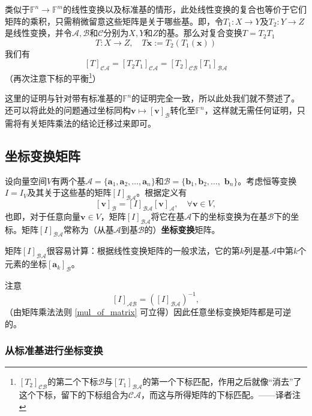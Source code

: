 类似于$\mathbb{F}^n\to \mathbb{F}^m$的线性变换以及标准基的情形，此处线性变换的复合也等价于它们矩阵的乘积，只需稍微留意这些矩阵是关于哪些基。即，令$T_{1}:X\to Y$及$T_{2}:Y\to Z$是线性变换，并令$\mathcal{A},\mathcal{B}$和$\mathcal{C}$分别为$X,Y$和$Z$的基。那么对复合变换$T=T_2T_1$
\[T:X\to Z,\quad T\mathbf{x}:=T_2(T_1(\mathbf{x}))\]
我们有
\begin{equation}\label{mul_of_matrix}
  \left[T\right]_{\mathcal{CA}}=\left[T_2T_1\right]_{\mathcal{CA}}=\left[T_2\right]_{\mathcal{CB}}\left[T_1\right]_{\mathcal{BA}}
\end{equation}
（再次注意下标的平衡\footnote{$\left[T_2\right]_{\mathcal{CB}}$的第二个下标$\mathcal{B}$与$\left[T_1\right]_{\mathcal{BA}}$的第一个下标匹配，作用之后就像“消去”了这个下标，留下的下标组合为$\mathcal{CA}$，而这与所得矩阵的下标匹配。——译者注}）

这里的证明与针对带有标准基的$\mathbb{F}^n$的证明完全一致，所以此处我们就不赘述了。还可以将此处的问题通过坐标同构$\mathbf{v}\mapsto\left[\mathbf{v}\right]_{\mathcal{B}}$转化至$\mathbb{F}^n$，这样就无需任何证明，只需将有关矩阵乘法的结论迁移过来即可。

\subsection{坐标变换矩阵}

设向量空间$V$有两个基$\mathcal{A} = \{\mathbf{a}_1,\mathbf{a}_2,\ldots,\mathbf{a}_n\}$和$\mathcal{B} = \{\mathbf{b}_1,\mathbf{b}_2,\ldots,$ $\mathbf{b}_n\}$。考虑恒等变换$I=I_V$及其关于这些基的矩阵$[I]_{\mathcal{BA}}$。根据定义有\[\left[\mathbf{v}\right]_{\mathcal{B}}=[I]_{\mathcal{BA}}\left[\mathbf{v}\right]_{\mathcal{A}},\quad\forall\mathbf{v}\in V,\]
也即，对于任意向量$\mathbf{v}\in V$，矩阵$[I]_{\mathcal{BA}}$将它在基$\mathcal{A}$下的坐标变换为在基$\mathcal{B}$下的坐标。矩阵$[I]_{\mathcal{BA}}$常称为（从基$\mathcal{A}$到基$\mathcal{B}$的）\textbf{坐标变换}矩阵。

矩阵$[I]_{\mathcal{BA}}$很容易计算：根据线性变换矩阵的一般求法，它的第$k$列是基$\mathcal{A}$中第$k$个元素的坐标$\left[\mathbf{a}_k\right]_{\mathcal{B}}$。

注意\[[I]_{\mathcal{AB}}=([I]_{\mathcal{BA}})^{-1},\]
（由矩阵乘法法则 \eqref{mul_of_matrix} 可立得）因此任意坐标变换矩阵都是可逆的。

\subsubsection{从标准基进行坐标变换}

